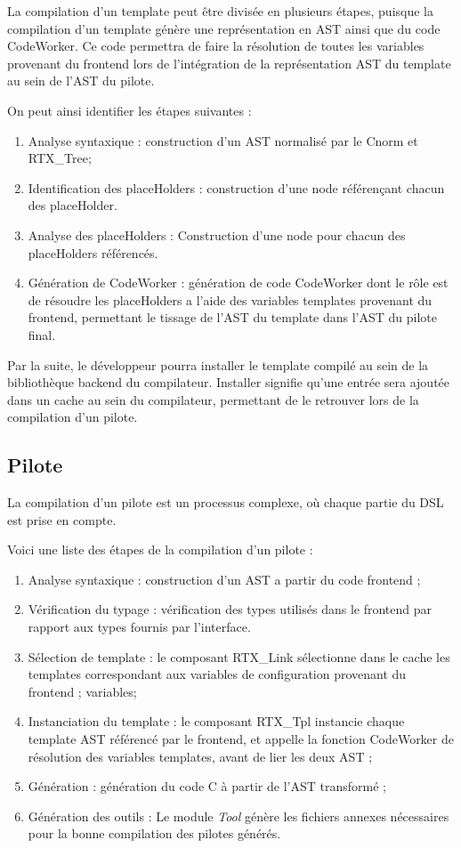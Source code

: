 \documentclass[french]{rtxreport}
\begin{document}
La compilation d'un template peut être divisée en plusieurs étapes, puisque la
compilation d'un template génère une représentation en AST ainsi que du code
CodeWorker. Ce code permettra de faire la résolution de toutes les variables
provenant du frontend lors de l'intégration de la représentation AST du
template au sein de l'AST du pilote.

On peut ainsi identifier les étapes suivantes :
\begin{enumerate}
    \item Analyse syntaxique : construction d'un AST normalisé par le Cnorm et
        RTX\_Tree;
    \item Identification des placeHolders : construction d'une node référençant
        chacun des placeHolder.
    \item Analyse des placeHolders : Construction d'une node pour chacun des
        placeHolders référencés.
    \item Génération de CodeWorker : génération de code CodeWorker dont le rôle
        est de résoudre les placeHolders a l'aide des variables templates
        provenant du frontend, permettant le tissage de l'AST du template dans
        l'AST du pilote final.
\end{enumerate}

Par la suite, le développeur pourra installer le template compilé au sein de la
bibliothèque backend du compilateur. Installer signifie qu'une entrée sera
ajoutée dans un cache au sein du compilateur, permettant de le retrouver lors
de la compilation d'un pilote.


\subsection{Pilote}
\label{sec:driverCompilation}

La compilation d'un pilote est un processus complexe, où chaque partie du DSL
est prise en compte.

Voici une liste des étapes de la compilation d'un pilote :
\begin{enumerate}
    \item Analyse syntaxique : construction d'un AST a partir du code frontend ;
    \item Vérification du typage : vérification des types utilisés dans le
        frontend par rapport aux types fournis par l'interface.
    \item Sélection de template : le composant RTX\_Link sélectionne dans le
        cache les templates correspondant aux variables de configuration
        provenant du frontend ; variables;
    \item Instanciation du template : le composant RTX\_Tpl instancie chaque
        template AST référencé par le frontend, et appelle la fonction
        CodeWorker de résolution des variables templates, avant de lier les
        deux AST ;
    \item Génération : génération du code C à partir de l'AST transformé ;
    \item Génération des outils : Le module \emph{Tool} génère les fichiers
        annexes nécessaires pour la bonne compilation des pilotes générés.
\end{enumerate}
\end{document}
